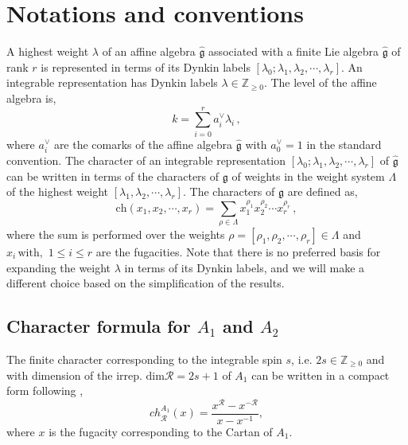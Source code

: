 \documentclass[a4paper,12pt]{article}
\begin{document}
\section{Notations and conventions}\label{Notations}


A highest weight $\lambda$ of an affine algebra $\hat{\mathfrak{g}}$  associated with a finite Lie algebra $\hat{\mathfrak{g}}$ of rank $r$ is represented in terms of its Dynkin labels $[\lambda_0;\lambda_1, \lambda_2,\cdots, \lambda_r]$. An integrable representation has Dynkin labels $\lambda\in\mathbb{Z}_{\geq 0}$. The level of the affine algebra is,
\begin{equation}
    k=\sum_{i=0}^{r} a_{i}^\vee \lambda_i\, ,
\end{equation}
where $a_{i}^\vee$ are the comarks of the affine algebra $\hat{\mathfrak{g}}$ with $a_{0}^\vee=1$ in the standard convention. The character of an integrable representation $[\lambda_0;\lambda_1, \lambda_2,\cdots, \lambda_r]$ of $\hat{\mathfrak{g}}$ can be written in terms of the characters of $\mathfrak{g}$ of weights in the weight system $\Lambda$ of the highest weight $[\lambda_1, \lambda_2,\cdots, \lambda_r]$. The characters of $\mathfrak{g}$ are defined as,
\begin{equation}\label{general_def_char}
 \mathrm{ch}(x_1,x_2,\cdots,x_r)=\sum_{\rho\in\Lambda} x_1^{\rho_1}x_2^{\rho_2}\cdots x_r^{\rho_r}\, ,
\end{equation}
where the sum is performed over the weights $\rho=[\rho_1, \rho_2,\cdots, \rho_r]\in\Lambda$ and $x_i\, \text{with, }\, 1\leq i\leq r$ are the fugacities. Note that there is no preferred basis for expanding the weight $\lambda$ in terms of its Dynkin labels, and we will make a different choice based on the simplification of the results.


\subsection{Character formula for \ensuremath{A_1} and \ensuremath{A_2}}\label{a2 basics}

The finite character corresponding to the integrable spin $s$, i.e. $2s\in\mathbb{Z}_{\geq 0}$ and with dimension of the irrep. $\mathrm{dim}\mathcal{R}=2s+1$ of $A_1$ can be written in a compact form following \cite{DiFrancesco:1997nk},
%
\begin{equation}
    ch_{\mathcal{R}}^{A_1}(x)=\frac{x^{\mathcal{R}}-x^{-\mathcal{R}}}{x-x^{-1}},
\end{equation}
%
where $x$ is the fugacity corresponding to the Cartan of $A_1$.
\end{document}
